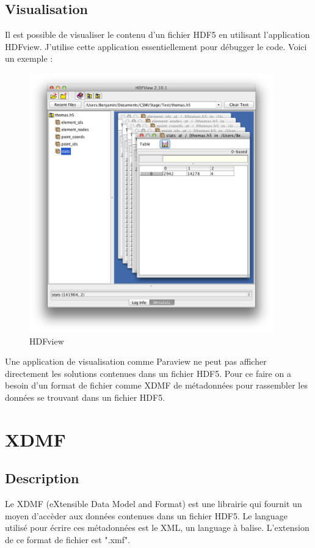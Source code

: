 \documentclass[12pt]{article}
\begin{document}
\subsection {Visualisation}
Il est possible de visualiser le contenu d'un fichier HDF5 en utilisant l'application HDFview. J'utilise cette application essentiellement pour débugger le code.\newline
Voici un exemple :

\begin {figure}[!h]
\begin {center}
\includegraphics [width = 300pt] {HDFview.png}
\caption {HDFview}
\end {center}
\end {figure}
Une application de visualisation comme Paraview ne peut pas afficher directement les solutions contenues dans un fichier HDF5. Pour ce faire on a besoin d'un format de fichier comme XDMF de métadonnées pour rassembler les données se trouvant dans un fichier HDF5.
\newpage
\section {XDMF}
\subsection {Description}
Le XDMF (eXtensible Data Model and Format) est une librairie qui fournit un moyen d'accèder aux données contenues dans un fichier HDF5. Le language utilisé pour écrire ces métadonnées est le XML, un language à balise. L'extension de ce format de fichier est ".xmf".
\end{document}
